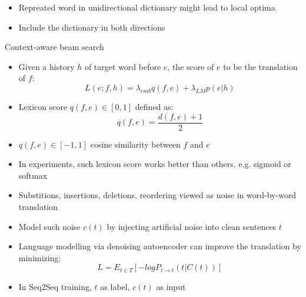 \documentclass[11pt, a4paper, landscape]{article}
\begin{document}
	\begin{itemize}
		\item Repreated word in unidirectional dictionary might lead to local optima
		\item Include the dictionary in both directions
	\end{itemize}
	\vfill
	\NewPage
	\vfill
	Context-aware beam search
	\begin{itemize}
		\item Given a history $h$ of target word before $e$, the score of $e$ to be the translation of $f$:
		\[ L(e;f,h)=\lambda_{emb}q(f,e) + \lambda_{LM}p(e|h)\]
		\item Lexicon score $q(f,e) \in [0,1] $ defined as:
		\[ q(f,e)= \frac{d(f,e)+1}{2}\]
		\item $q(f,e)\in [-1,1]$ cosine similarity between $f$ and $e$
		\item In experiments, such lexicon score works better than others, e.g. sigmoid or softmax
	\end{itemize}
	
	\vfill
	\NewPage
	\vfill
	
	
	\begin{itemize}
		\item Substitions, insertions, deletions, reordering viewed as noise in word-by-word translation
		\item Model such noise $c(t)$ by injecting artificial noise into clean sentences $t$
		\item Language modelling via denoising autoencoder can improve the translation by minimizing:
		\[ L = E_{t \in T}[-logP_{t\rightarrow t}(t|C(t))]\]
		\item In Seq2Seq training, $t$ as label, $c(t)$  as input 
	\end{itemize}
	
	
	\vfill
	\NewPage
	\vfill
	
\end{document}
